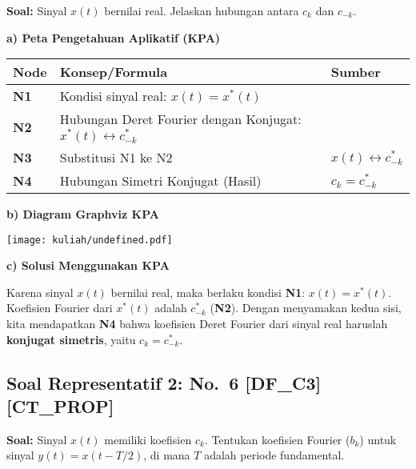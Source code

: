 \documentclass[
  letterpaper,
  DIV=11,
  numbers=noendperiod]{scrreprt}
\begin{document}
\textbf{Soal:} Sinyal \(x(t)\) bernilai real. Jelaskan hubungan antara
\(c_k\) dan \(c_{-k}\).

\textbf{a) Peta Pengetahuan Aplikatif (KPA)}

\begin{longtable}[]{@{}
  >{\centering\arraybackslash}p{}
  >{\raggedright\arraybackslash}p{}
  >{\raggedright\arraybackslash}p{}@{}}
\toprule\noalign{}
\begin{minipage}[b]{\linewidth}\centering
Node
\end{minipage} & \begin{minipage}[b]{\linewidth}\raggedright
Konsep/Formula
\end{minipage} & \begin{minipage}[b]{\linewidth}\raggedright
Sumber
\end{minipage} \\
\midrule\noalign{}
\endhead
\bottomrule\noalign{}
\endlastfoot
\textbf{N1} & Kondisi sinyal real: \(x(t) = x^*(t)\) & \\
\textbf{N2} & Hubungan Deret Fourier dengan Konjugat:
\(x^*(t) \leftrightarrow c^*_{-k}\) & \\
\textbf{N3} & Substitusi N1 ke N2 & \(x(t) \leftrightarrow c^*_{-k}\) \\
\textbf{N4} & Hubungan Simetri Konjugat (Hasil) & \(c_k = c^*_{-k}\) \\
\end{longtable}

\textbf{b) Diagram Graphviz KPA}

\texttt{[image: kuliah/undefined.pdf]}

\textbf{c) Solusi Menggunakan KPA}

Karena sinyal \(x(t)\) bernilai real, maka berlaku kondisi \textbf{N1}:
\(x(t) = x^*(t)\). Koefisien Fourier dari \(x^*(t)\) adalah \(c^*_{-k}\)
(\textbf{N2}). Dengan menyamakan kedua sisi, kita mendapatkan
\textbf{N4} bahwa koefisien Deret Fourier dari sinyal real haruslah
\textbf{konjugat simetris}, yaitu \textbf{\(c_k = c^*_{-k}\)}.

\subsection{Soal Representatif 2: No.~6
{[}DF\_C3{]}{[}CT\_PROP{]}}\label{soal-representatif-2-no.-6-df_c3ct_prop}

\textbf{Soal:} Sinyal \(x(t)\) memiliki koefisien \(c_k\). Tentukan
koefisien Fourier (\(b_k\)) untuk sinyal \(y(t) = x(t - T/2)\), di mana
\(T\) adalah periode fundamental.
\end{document}
